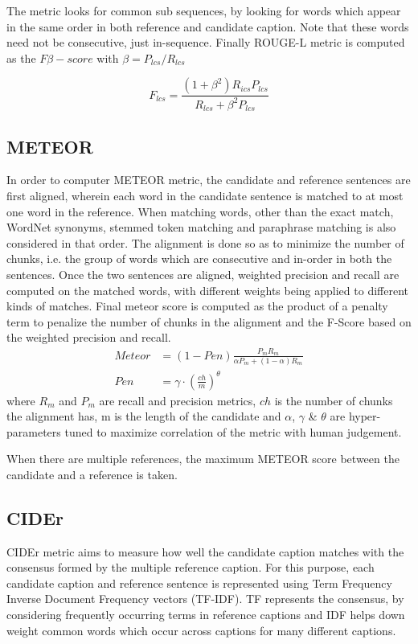 The metric looks for common sub sequences, by looking for words which appear in the
same order in both reference and candidate caption.
Note that these words need not be consecutive, just in-sequence.
Finally ROUGE-L metric is computed as the $F\beta-score$ with $\beta =
P_{lcs}/R_{lcs}$

\begin{equation}
        F_{lcs} = \frac{(1+\beta^2)R_{ics}P_{lcs}}{R_{lcs}+ \beta^2 P_{lcs}}
\end{equation}

\subsection{METEOR}
In order to computer METEOR metric, the candidate and reference sentences are
first aligned, wherein each word in the candidate sentence is matched to
at most one word in the reference.
When matching words, other than the exact match, WordNet synonyms, stemmed token
matching and paraphrase matching is also considered in that order.
The alignment is done so as to minimize the number of chunks, i.e. the group of
words which are consecutive and in-order in both the sentences.
Once the two sentences are aligned, weighted precision and recall are computed
on the matched words, with different weights being applied to different kinds of
matches.
Final meteor score is computed as the product of a penalty term to penalize the
number of chunks in the alignment and the F-Score based on the weighted
precision and recall.
\begin{align}
        Meteor &= (1-Pen)\frac{P_m R_m}{\alpha{}P_m+(1-\alpha)R_m}\\[0.75ex]
        Pen &= \gamma\cdot\left(\frac{ch}{m}\right)^\theta
\end{align}
\noindent where $R_m$ and $P_m$ are recall and precision metrics, $ch$ is the
number of chunks the alignment has, m is the length of the candidate and
$\alpha$, $\gamma$ \& $\theta$ are hyper-parameters tuned to maximize
correlation of the metric with human judgement.

When there are multiple references, the maximum METEOR score between the
candidate and a reference is taken.

\subsection{CIDEr}
CIDEr metric aims to measure how well the candidate caption matches with the
consensus formed by the multiple reference caption.
For this purpose, each candidate caption and reference sentence is represented
using Term Frequency Inverse Document Frequency vectors (TF-IDF).
TF represents the consensus, by considering frequently occurring terms in
reference captions and IDF helps down weight common words which occur across
captions for many different captions.

